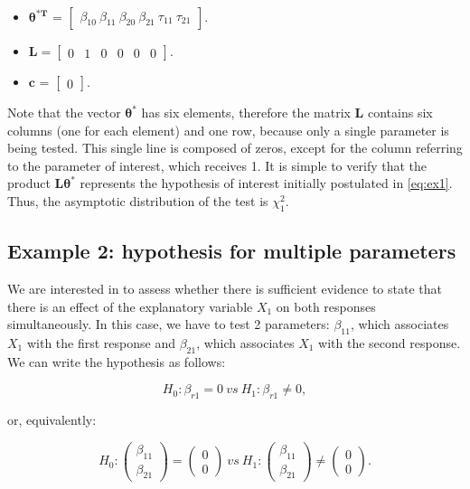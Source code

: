 \documentclass[AMA,STIX1COL]{WileyNJD-v2}
\begin{document}
\begin{itemize}
  
  \item $\boldsymbol{\theta^{*T}}$ = $\begin{bmatrix} \beta_{10} \  \beta_{11} \ \beta_{20} \ \beta_{21} \ \tau_{11} \ \tau_{21} \end{bmatrix}$.

\item $\boldsymbol{L} = \begin{bmatrix} 0 & 1 & 0 & 0 & 0 & 0  \end{bmatrix}.$
 
\item $\boldsymbol{c}$ = $\begin{bmatrix} 0 \end{bmatrix}.$

\end{itemize}

Note that the vector $\boldsymbol{\theta^{*}}$ has six elements, therefore the matrix $\boldsymbol{L}$ contains six columns (one for each element) and one row, because only a single parameter is being tested. This single line is composed of zeros, except for the column referring to the parameter of interest, which receives 1. It is simple to verify that the product $\boldsymbol{L}\boldsymbol{\theta^{*}}$ represents the hypothesis of interest initially postulated in \autoref{eq:ex1}. Thus, the asymptotic distribution of the test is $\chi^2_1$.

\subsection{Example 2: hypothesis for multiple parameters}\label{sec:ex2}

We are interested in to assess whether there is sufficient evidence to state that there is an effect of the explanatory variable $X_1$ on both responses simultaneously. 
In this case, we have to test 2 parameters: $\beta_{11}$, which associates $X_1$ with the first response and $\beta_{21}$, which associates $X_1$ with the second response. 
We can write the hypothesis as follows:

\begin{equation}
\label{eq:ex2}
H_0: \beta_{r1} = 0 \ vs \ H_1: \beta_{r1} \neq 0,
\end{equation}

\noindent or, equivalently:

$$
H_0: 
\begin{pmatrix}
\beta_{11} \\ 
\beta_{21}
\end{pmatrix} 
= 
\begin{pmatrix}
0 \\ 
0
\end{pmatrix}
\ vs \ 
H_1: 
\begin{pmatrix}
\beta_{11} \\ 
\beta_{21}
\end{pmatrix} 
\neq
\begin{pmatrix}
0 \\ 
0 
\end{pmatrix}.
$$
\end{document}

